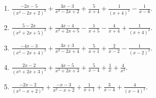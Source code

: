 \documentclass[11pt,oneside]{book}
\begin{document}
\begin{enumerate}[leftmargin=*,label=\textbf{Y\arabic*.},itemsep=0.45\baselineskip]
\item $\displaystyle \frac{- 2 x - 5}{\left(x^{2} - 2 x + 2\right)^{2}} + \frac{3 x - 3}{x^{2} - 2 x + 2} + \frac{5}{x + 4} + \frac{1}{\left(x + 4\right)^{2}} - \frac{1}{x - 6}$.
\item $\displaystyle \frac{5 - 2 x}{\left(x^{2} + 2 x + 5\right)^{2}} + \frac{4 x - 4}{x^{2} + 2 x + 5} - \frac{1}{x + 5} - \frac{4}{x + 4} + \frac{1}{\left(x + 4\right)^{2}}$.
\item $\displaystyle \frac{- 4 x - 3}{\left(x^{2} - 2 x + 4\right)^{2}} + \frac{3 x + 3}{x^{2} - 2 x + 4} + \frac{5}{x + 1} + \frac{2}{x - 2} - \frac{1}{\left(x - 2\right)^{2}}$.
\item $\displaystyle \frac{2 x - 2}{\left(x^{2} + 2 x + 3\right)^{2}} + \frac{4 x - 5}{x^{2} + 2 x + 3} + \frac{5}{x - 4} + \frac{1}{x} + \frac{4}{x^{2}}$.
\item $\displaystyle \frac{- 2 x - 2}{\left(x^{2} - x + 2\right)^{2}} + \frac{- x - 3}{x^{2} - x + 2} + \frac{1}{x + 1} + \frac{3}{x - 4} + \frac{4}{\left(x - 4\right)^{2}}$.
\end{enumerate}
\end{document}
